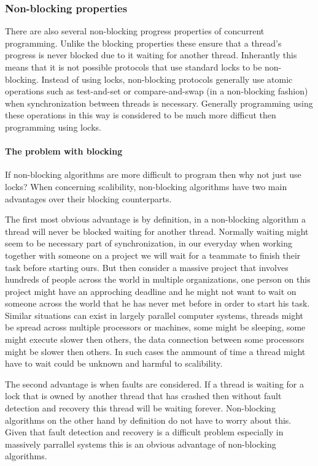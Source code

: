\subsubsection{Non-blocking properties}
There are also several non-blocking progress properties of concurrent programming.
Unlike the blocking properties these ensure that a thread's progress is never blocked
due to it waiting for another thread.
Inherantly this means that it is not possible protocols that use standard locks
to be non-blocking.
Instead of using locks, non-blocking protocols generally use atomic operations
such as test-and-set or compare-and-swap (in a non-blocking fashion) when synchronization between threads is necessary.
Generally programming using these operations in this way is considered to be much more difficut then
programming using locks.

\paragraph{The problem with blocking}
If non-blocking algorithms are more difficult to program then why not just use locks?
When concerning scalibility, non-blocking algorithms have two main advantages over their blocking counterparts.

The first most obvious advantage is by definition, in a non-blocking algorithm a thread will never be blocked
waiting for another thread.
Normally waiting might seem to be necessary part of synchronization, in our everyday when working together
with someone on a project we will wait for a teammate to finish their task before starting ours.
But then consider a massive project that involves hundreds of people across the world in multiple organizations,
one person on this project might have an approching deadline and he might not want to wait on someone across the
world that he has never met before in order to start his task.
Similar situations can exist in largely parallel computer systems, threads might be spread across multiple
processors or machines, some might be sleeping, some might execute slower then others, the data connection between
some processors might be slower then others.
In such cases the ammount of time a thread might have to wait could be unknown and harmful to scalibility.

The second advantage is when faults are considered.
If a thread is waiting for a lock that is owned by another thread that has crashed
then without fault detection and recovery this thread will be waiting forever.
Non-blocking algorithms on the other hand by definition do not have to worry about this.
Given that fault detection and recovery is a difficult problem especially in massively parrallel
systems this is an obvious advantage of non-blocking algorithms.

